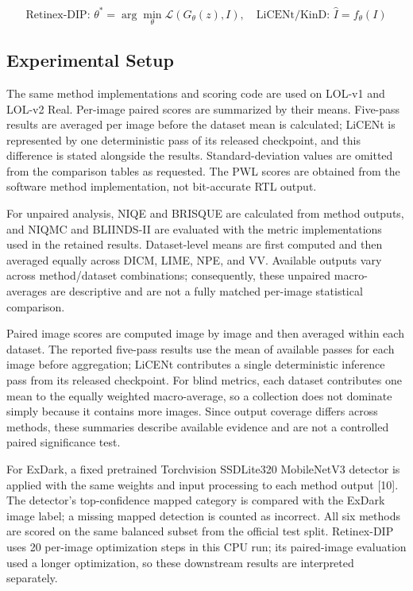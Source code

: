\documentclass[conference]{IEEEtran}
\begin{document}
\begin{equation}\text{Retinex-DIP: }\theta^*=\arg\min_\theta\mathcal{L}(G_\theta(z),I),\quad \text{LiCENt/KinD: }\hat I=f_\theta(I)\tag{4}\end{equation}

\subsection{Experimental Setup}

The same method implementations and scoring code are used on LOL-v1 and LOL-v2 Real. Per-image paired scores are summarized by their means. Five-pass results are averaged per image before the dataset mean is calculated; LiCENt is represented by one deterministic pass of its released checkpoint, and this difference is stated alongside the results. Standard-deviation values are omitted from the comparison tables as requested. The PWL scores are obtained from the software method implementation, not bit-accurate RTL output.

For unpaired analysis, NIQE and BRISQUE are calculated from method outputs, and NIQMC and BLIINDS-II are evaluated with the metric implementations used in the retained results. Dataset-level means are first computed and then averaged equally across DICM, LIME, NPE, and VV. Available outputs vary across method/dataset combinations; consequently, these unpaired macro-averages are descriptive and are not a fully matched per-image statistical comparison.

Paired image scores are computed image by image and then averaged within each dataset. The reported five-pass results use the mean of available passes for each image before aggregation; LiCENt contributes a single deterministic inference pass from its released checkpoint. For blind metrics, each dataset contributes one mean to the equally weighted macro-average, so a collection does not dominate simply because it contains more images. Since output coverage differs across methods, these summaries describe available evidence and are not a controlled paired significance test.

For ExDark, a fixed pretrained Torchvision SSDLite320 MobileNetV3 detector is applied with the same weights and input processing to each method output [10]. The detector's top-confidence mapped category is compared with the ExDark image label; a missing mapped detection is counted as incorrect. All six methods are scored on the same balanced subset from the official test split. Retinex-DIP uses 20 per-image optimization steps in this CPU run; its paired-image evaluation used a longer optimization, so these downstream results are interpreted separately.
\end{document}
